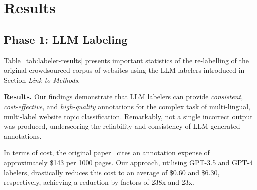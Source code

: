 \section{Results}

\subsection{Phase 1: LLM Labeling}



Table~\ref{tab:labeler-results} presents important statistics of the re-labelling of the original crowdsourced corpus of websites using the LLM labelers introduced in Section \textit{Link to Methods}.

\textbf{Results.} Our findings demonstrate that LLM labelers can provide \textit{consistent}, \textit{cost-effective}, and \textit{high-quality} annotations for the complex task of multi-lingual, multi-label website topic classification. Remarkably, not a single incorrect output was produced, underscoring the reliability and consistency of LLM-generated annotations.

In terms of cost, the original paper~\cite{homepage2vec} cites an annotation expense of approximately \$143 per 1000 pages. Our approach, utilising GPT-3.5 and GPT-4 labelers, drastically reduces this cost to an average of \$0.60 and \$6.30, respectively, achieving a reduction by factors of 238x and 23x.









